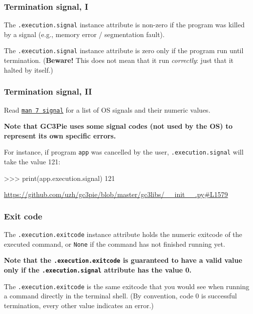 \documentclass[english,serif,mathserif,xcolor=pdftex,dvipsnames,table]{beamer}
\begin{document}
\begin{frame}[fragile]
  \frametitle{Termination signal, I}

  The \texttt{.execution.signal} instance attribute is non-zero if
  the program was killed by a signal (e.g., memory error / segmentation fault).

  \+
  The \texttt{.execution.signal} instance attribute is zero only if
  the program run until termination. (\textbf{Beware!} This does not
  mean that it run \emph{correctly}: just that it halted by itself.)
\end{frame}


\begin{frame}[fragile]
  \frametitle{Termination signal, II}

  Read
  \href{http://man7.org/linux/man-pages/man7/signal.7.html}{\texttt{man
      7 signal}} for a list of OS signals and their numeric values.

  \+
  {\bfseries Note that GC3Pie uses some signal codes (not used
    by the OS) to represent its own specific errors.}

  \+
  For instance, if program \texttt{app} was cancelled by the user,
  \texttt{.execution.signal} will take the value 121:
\begin{python}
>>> print(app.execution.signal)
121
\end{python}

\begin{references}
  \tiny\url{https://github.com/uzh/gc3pie/blob/master/gc3libs/__init__.py#L1579}
\end{references}
\end{frame}


\begin{frame}[fragile]
  \frametitle{Exit code}

  The \texttt{.execution.exitcode} instance attribute holds the
  numeric exitcode of the executed command, or \texttt{None} if the
  command has not finished running yet.

  \+
  {\bfseries Note that the \texttt{.execution.exitcode} is guaranteed
    to have a valid value only if the \texttt{.execution.signal}
    attribute has the value 0.}

  \+
  The \texttt{.execution.exitcode} is the same exitcode that you
  would see when running a command directly in the terminal shell. (By
  convention, code 0 is successful termination, every other value
  indicates an error.)
\end{frame}
\end{document}

